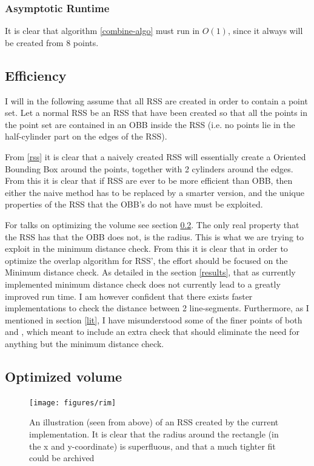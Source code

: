 \subsubsection{Asymptotic Runtime}
It is clear that algorithm \ref{combine-algo} must run in $O(1)$, since it always will be created from 8 points. 

\subsection{Efficiency}
I will in the following assume that all RSS are created in order to contain a point set. Let a normal RSS be an RSS that have been created so that all the points in the point set are contained in an OBB inside the RSS (i.e. no points lie in the half-cylinder part on the edges of the RSS).  

From \ref{rss} it is clear that a naively created RSS will essentially create a Oriented Bounding Box around the points, together with 2 cylinders around the edges. From this it is clear that if RSS are ever to be more efficient than OBB, then either the naive method has to be replaced by a smarter version, and the unique properties of the RSS that the OBB's do not have must be exploited. 

For talks on optimizing the volume see section \ref{optimized-volume}. The only real property that the RSS has that the OBB does not, is the radius. This is what we are trying to exploit in the minimum distance check. From this it is clear that in order to optimize the overlap algorithm for RSS', the effort should be focused on the Minimum distance check. As detailed in the section \ref{results}, that as currently implemented minimum distance check does not currently lead to a greatly improved run time. I am however confident that there exists faster implementations to check the distance between 2 line-segments. 
Furthermore, as I mentioned in section \ref{lit}, I have misunderstood some of the finer points of both \cite{Larsen99fastproximity} and \cite{larsen00fast}, which meant to include an extra check that should eliminate the need for anything but the minimum distance check. 

\subsection{Optimized volume}
\label{optimized-volume}
\begin{figure}
\centering
\texttt{[image: figures/rim]}
\caption{\label{rim} An illustration (seen from above) of an RSS created by the current implementation. It is clear that the radius around the rectangle (in the x and y-coordinate) is superfluous, and that a much tighter fit could be archived}
\end{figure}

